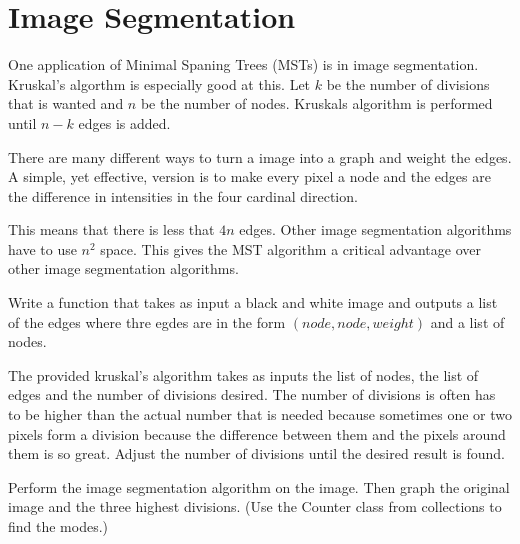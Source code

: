 \label{Ch:MSTImgSeg}


\section*{Image Segmentation}


One application of Minimal Spaning Trees (MSTs) is in image segmentation.
Kruskal's algorthm is especially good at this.
Let $k$ be the number of divisions that is wanted and $n$ be the number of nodes.
Kruskals algorithm is performed until $n-k$ edges is added.

There are many different ways to turn a image into a graph and weight the edges.
A simple, yet effective, version is to make every pixel a node and the edges are the difference in intensities in the four cardinal direction. 

This means that there is less that $4n$ edges.
Other image segmentation algorithms have to use $n^2$ space.
This gives the MST algorithm a critical advantage over other image segmentation algorithms. 

\begin{problem}
Write a function that takes as input a black and white image and outputs a list of the edges where thre egdes are in the form $(node,node,weight)$ and a list of nodes.
\end{problem}

The provided kruskal's algorithm takes as inputs the list of nodes, the list of edges and the number of divisions desired.
The number of divisions is often has to be higher than the actual number that is needed because sometimes one or two pixels form a division because the difference between them and the pixels around them is so great.
Adjust the number of divisions until the desired result is found.

\begin{problem}
Perform the image segmentation algorithm on the image.
Then graph the original image and the three highest divisions.
(Use the Counter class from collections to find the modes.) 
\end{problem}

